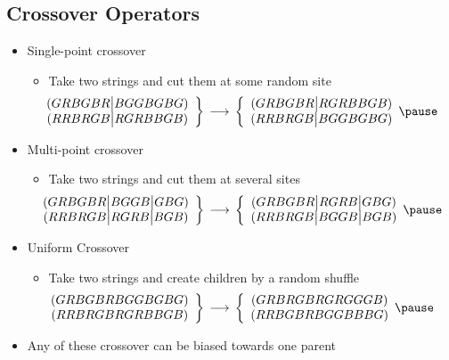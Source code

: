 
\begin{slide}
\section[-1]{Crossover Operators}

\begin{PauseHighLight}
  \begin{itemize}
  \item Single-point crossover
    \begin{itemize}
    \item Take two strings and cut them at some random site
      {\scriptsize\[
        \hspace{-2em}\begin{array}{c}
          (GRBGBR\big|BGGBGBG)\\ (RRBRGB\big|RGRBBGB)
        \end{array} \bigg\}\, \longrightarrow \, \bigg\{
        \begin{array}{c}
          (GRBGBR\big|RGRBBGB)\\
          (RRBRGB\big|BGGBGBG)
        \end{array}
        \pause\]}
    \end{itemize}
  \item Multi-point crossover
    \begin{itemize}
    \item Take two strings and cut them at several sites
      {\scriptsize\[
        \hspace{-2em}\begin{array}{c}
          (GRBGBR\big|BGGB\big|GBG)\\ (RRBRGB\big|RGRB\big|BGB)
        \end{array} \bigg\}\, \longrightarrow \, \bigg\{
        \begin{array}{c}
          (GRBGBR\big|RGRB\big|GBG)\\
          (RRBRGB\big|BGGB\big|BGB)
        \end{array}
        \pause\]}
    \end{itemize}
  \item Uniform Crossover
    \begin{itemize}
    \item Take two strings and create children by a random shuffle
      {\scriptsize\[
        \hspace{-2em}\begin{array}{c}
          (GRBGBRBGGBGBG)\\
          (RRBRGBRGRBBGB)
        \end{array} \bigg\}\, \longrightarrow \, \bigg\{
        \begin{array}{c}
          (GRBRGBRGRGGGB)\\
          (RRBGBRBGGBBBG)
        \end{array}
        \pause\]}
    \end{itemize}
  \item Any of these crossover can be biased towards one parent\pause
  \end{itemize}
\end{PauseHighLight}


\end{slide}
